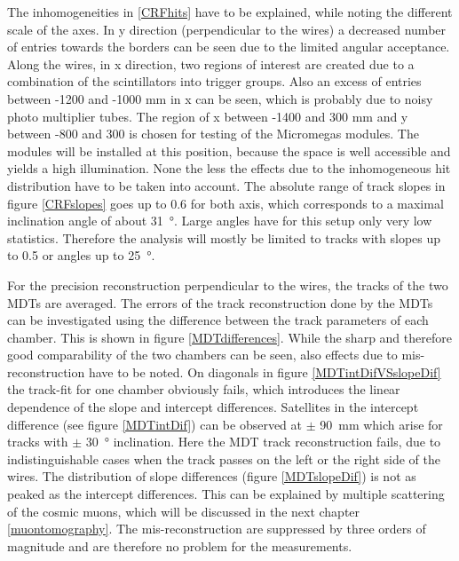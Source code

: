 \documentclass[
twoside,            %
BCOR1.4cm,          %
10pt,               %
headings=normal,    %
headsepline,        %
clearplainpage,		%
final,              %
div=14,
open=right,
bibliography=toc
]{scrreprt}
\begin{document}
The inhomogeneities in \ref{CRFhits} have to be explained, while noting the different scale of the axes.
In y direction (perpendicular to the wires) a decreased number of entries towards the borders can be seen due to the limited angular acceptance.
Along the wires, in x direction, two regions of interest are created due to a combination of the scintillators into trigger groups.
Also an excess of entries between -1200 and -1000 mm in x can be seen, which is probably due to noisy photo multiplier tubes.
The region of x between -1400 and 300 mm and y between -800 and 300 is chosen for testing of the Micromegas modules.
The modules will be installed at this position, because the space is well accessible and yields a high illumination.
None the less the effects due to the inhomogeneous hit distribution have to be taken into account.
The absolute range of track slopes in figure \ref{CRFslopes} goes up to 0.6 for both axis, which corresponds to a maximal inclination angle of about \SI{31}{\degree}.
Large angles have for this setup only very low statistics.
Therefore the analysis will mostly be limited to tracks with slopes up to 0.5 or angles up to \SI{25}{\degree}.

For the precision reconstruction perpendicular to the wires, the tracks of the two MDTs are averaged.
The errors of the track reconstruction done by the MDTs can be investigated using the difference between the track parameters of each chamber.
This is shown in figure \ref{MDTdifferences}.
While the sharp and therefore good comparability of the two chambers can be seen, also effects due to mis-reconstruction have to be noted.
On diagonals in figure \ref{MDTintDifVSslopeDif} the track-fit for one chamber obviously fails, which introduces the linear dependence of the slope and intercept differences.
Satellites in the intercept difference (see figure \ref{MDTintDif}) can be observed at $\pm$ \SI{90}{mm} which arise for tracks with $\pm$ \SI{30}{\degree} inclination.
Here the MDT track reconstruction fails, due to indistinguishable cases when the track passes on the left or the right side of the wires.
The distribution of slope differences (figure \ref{MDTslopeDif}) is not as peaked as the intercept differences.
This can be explained by multiple scattering of the cosmic muons, which will be discussed in the next chapter \ref{muontomography}.
The mis-reconstruction are suppressed by three orders of magnitude and are therefore no problem for the measurements.
\end{document}
